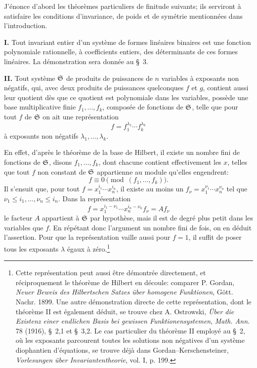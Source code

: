 J'énonce d'abord les théorèmes particuliers de finitude suivants; ils serviront à satisfaire les conditions d'invariance, de poids et de symétrie mentionnées dans l'introduction.

\textbf{I.} Tout invariant entier d'un système de formes linéaires binaires est une fonction polynomiale rationnelle, à coefficients entiers, des déterminants de ces formes linéaires. La démonstration sera donnée au \S\ 3.

\textbf{II.} Tout système $\mathfrak S$ de produits de puissances de $n$ variables à exposants non négatifs, qui, avec deux produits de puissances quelconques $f$ et $g$, contient aussi leur quotient dès que ce quotient est polynomiale dans les variables, possède une base multiplicative finie $f_1,\ldots,f_k$, composée de fonctions de $\mathfrak S$, telle que pour tout $f$ de $\mathfrak S$ on ait une représentation
\[
        f=f_1^{\lambda_1}\cdots f_k^{\lambda_k}
\]
à exposants non négatifs $\lambda_1,\ldots,\lambda_k$.

En effet, d'après le théorème de la base de Hilbert, il existe un nombre fini de fonctions de $\mathfrak S$, disons $f_1,\ldots,f_k$, dont chacune contient effectivement les $x$, telles que tout $f$ non constant de $\mathfrak S$ appartienne au module qu'elles engendrent:
\[
        f\equiv0\pmod{(f_1,\ldots,f_k)}.
\]
Il s'ensuit que, pour tout $f=x_1^{i_1}\cdots x_n^{i_n}$, il existe au moins un $f_\nu=x_1^{\nu_1}\cdots x_n^{\nu_n}$ tel que $\nu_1\le i_1,\ldots,\nu_n\le i_n$. Dans la représentation
\[
        f=x_1^{i_1-\nu_1}\cdots x_n^{i_n-\nu_n} f_\nu = A f_\nu
\]
le facteur $A$ appartient à $\mathfrak S$ par hypothèse, mais il est de degré plus petit dans les variables que $f$. En répétant donc l'argument un nombre fini de fois, on en déduit l'assertion. Pour que la représentation vaille aussi pour $f=1$, il suffit de poser tous les exposants $\lambda$ égaux à zéro.\footnote{Cette représentation peut aussi être démontrée directement, et réciproquement le théorème de Hilbert en découle: comparer P. Gordan, \emph{Neuer Beweis des Hilbertschen Satzes über homogene Funktionen}, Gött. Nachr. 1899. Une autre démonstration directe de cette représentation, dont le théorème II est également déduit, se trouve chez A. Ostrowski, \emph{Über die Existenz einer endlichen Basis bei gewissen Funktionensystemen}, \emph{Math. Ann.} 78 (1916), \S\ 2,1 et \S\ 3,2. Le cas particulier du théorème II employé au \S\ 2, où les exposants parcourent toutes les solutions non négatives d'un système diophantien d'équations, se trouve déjà dans Gordan--Kerschensteiner, \emph{Vorlesungen über Invariantentheorie}, vol. I, p. 199.}

